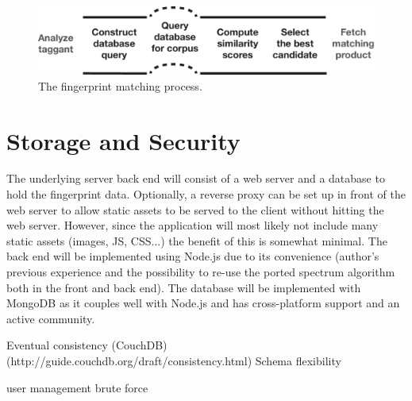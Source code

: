 \documentclass[thesis.tex]{subfiles}
\begin{document}
\begin{figure}[h]
\centering \includegraphics[width=\textwidth,height=\textheight,keepaspectratio=true]{images/design_implementation/matching_process}
\caption{The fingerprint matching process.\label{figure:matching-process}}
\end{figure}

\section{Storage and Security}
\label{chapter:storage-security}

The underlying server back end will consist of a web server and a database to hold the fingerprint data. Optionally, a reverse proxy can be set up in front of the web server to allow static assets to be served to the client without hitting the web server. However, since the application will most likely not include many static assets (images, JS, CSS...) the benefit of this is somewhat minimal. The back end will be implemented using Node.js due to its convenience (author's previous experience and the possibility to re-use the ported spectrum algorithm both in the front and back end). The database will be implemented with MongoDB as it couples well with Node.js and has cross-platform support and an active community.

Eventual consistency (CouchDB) (http://guide.couchdb.org/draft/consistency.html)
Schema flexibility

user management brute force
\end{document}
